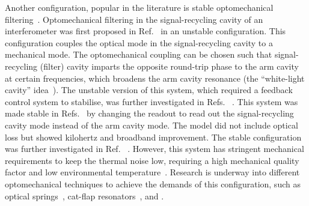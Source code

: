 Another configuration, popular  in the literature is stable optomechanical filtering~\cite{Li2020,Li2021,Miao2015,Miao2018,Page2018}. Optomechanical filtering in the signal-recycling cavity of an interferometer was first proposed in Ref.~\cite{Miao2015} in an unstable configuration. This configuration couples the optical mode in the signal-recycling cavity to a mechanical mode. The optomechanical coupling can be chosen such that signal-recycling (filter) cavity imparts the opposite round-trip phase to the arm cavity at certain frequencies, which broadens the arm cavity resonance (the ``white-light cavity'' idea~\cite{}).
The unstable version of this system, which required a feedback control system to stabilise, was further investigated in Refs.~\cite{Miao2018,Page2018,} . 
This system was made stable in Refs.~\cite{Li2020} by changing the readout to read out the signal-recycling cavity mode instead of the arm cavity mode. The model did not include optical loss but showed kilohertz and broadband improvement. The stable configuration was further investigated in Ref.~\cite{Li2021} .
However, this system has stringent mechanical requirements to keep the thermal noise low, requiring a high mechanical quality factor and low environmental temperature~\cite{}. Research is underway into different optomechanical techniques to achieve the demands of this configuration, such as optical springs~\cite{}, cat-flap resonators~\cite{}, and .

